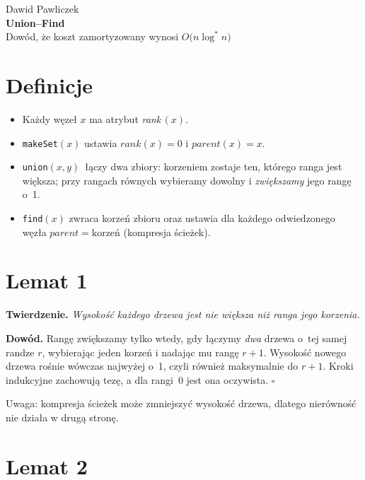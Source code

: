 \documentclass[11pt,a4paper]{article}
\begin{document}
\begin{center}
\Large Dawid Pawliczek\\
\vspace{2mm}
\textbf{Union–Find}\\[1ex]
Dowód, że koszt zamortyzowany wynosi $O\!\bigl(n\log^{\!*}\!n\bigr)$
\end{center}
\bigskip

\section*{Definicje}

\begin{itemize}
  \item Każdy węzeł $x$ ma atrybut \emph{rank}\,$(x)$.
  \item \texttt{makeSet}$(x)$ ustawia $rank(x)=0$ i $parent(x)=x$.
  \item \texttt{union}$(x,y)$~łączy dwa zbiory:
        korzeniem zostaje ten, którego ranga jest większa;
        przy rangach równych wybieramy dowolny i
        \emph{zwiększamy} jego rangę o~1.
  \item \texttt{find}$(x)$ zwraca korzeń zbioru
        oraz ustawia dla każdego odwiedzonego węzła
        $parent=\text{korzeń}$ (kompresja ścieżek).
\end{itemize}

\section*{Lemat 1}

\textbf{Twierdzenie.}
\emph{Wysokość każdego drzewa jest nie większa niż ranga jego korzenia.}

\smallskip
\textbf{Dowód.}
Rangę zwiększamy tylko wtedy, gdy łączymy \emph{dwa} drzewa
o~tej samej randze $r$, wybierając jeden korzeń
i nadając mu rangę $r+1$.
Wysokość nowego drzewa rośnie wówczas najwyżej o~1,
czyli również maksymalnie do $r+1$.
Kroki indukcyjne zachowują tezę, a dla rangi~0 jest ona oczywista.
\hfill$\square$

\medskip
Uwaga: kompresja ścieżek może zmniejszyć wysokość drzewa,
dlatego nierówność nie działa w drugą stronę.

\section*{Lemat 2}
\end{document}
